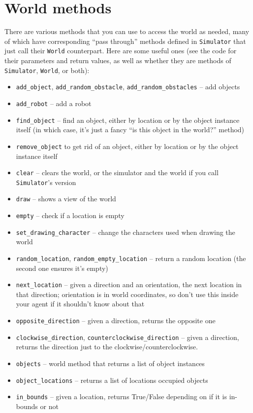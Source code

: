 \documentclass[11pt]{tufte-handout}
\begin{document}
\section{World methods}
\label{sec:org4dd451c}

There are various methods that you can use to access the world as needed, many of which have corresponding ``pass through'' methods defined in \texttt{Simulator} that just call their \texttt{World} counterpart.  Here are some useful ones (see the code for their parameters and return values, as well as whether they are methods of  \texttt{Simulator}, \texttt{World}, or both):
\begin{itemize}
\item \texttt{add\_object}, \texttt{add\_random\_obstacle}, \texttt{add\_random\_obstacles} -- add objects
\item \texttt{add\_robot} -- add a robot
\item \texttt{find\_object} -- find an object, either by location or by the object instance itself (in which case, it's just a fancy ``is this object in the world?'' method)
\item \texttt{remove\_object} to get rid of an object, either by location or by the object instance itself
\item \texttt{clear} -- clears the world, or the simulator and the world if you call \texttt{Simulator}'s version
\item \texttt{draw} -- shows a view of the world
\item \texttt{empty} -- check if a location is empty
\item \texttt{set\_drawing\_character} -- change the characters used when drawing the world
\item \texttt{random\_location}, \texttt{random\_empty\_location} -- return a random location (the second one ensures it's empty)
\item \texttt{next\_location} --  given a direction and an orientation, the next location in that direction; orientation is in world coordinates, so don't use this inside your agent if it shouldn't know about that
\item \texttt{opposite\_direction} -- given a direction, returns the opposite one
\item \texttt{clockwise\_direction}, \texttt{counterclockwise\_direction} -- given a direction, returns the direction just to the clockwise/counterclockwise.
\item \texttt{objects}  -- world method that returns a list of object instances
\item \texttt{object\_locations} -- returns a list of  locations occupied objects
\item \texttt{in\_bounds} -- given a location, returns True/False depending on if it is in-bounds or not
\end{itemize}
\end{document}
